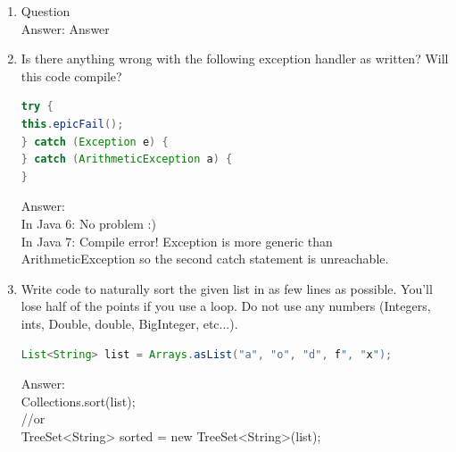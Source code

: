 \documentclass[11pt]{article}
\newenvironment{answer}{\large\lstset{basicstyle=\large\ttfamily}\color{white} \small{Answer:}}{}
\newenvironment{answer}{\large\lstset{basicstyle=\large\ttfamily}\color{red} \small{Answer:}}{}
\begin{document}
\begin{enumerate}
\item Question \\
\begin{answer}
Answer
\end{answer}



\item Is there anything wrong with the following exception handler as written? Will this
code compile? 
\begin{lstlisting}[language=java]
try {
this.epicFail();
} catch (Exception e) {
} catch (ArithmeticException a) {
}
\end{lstlisting}
\begin{answer}
\\ In Java 6: No problem :)
\\ In Java 7: Compile error!  Exception is more generic than ArithmeticException so the second catch statement is unreachable.
\end{answer}



\item Write code to naturally sort the given list in as few lines as possible. You'll lose half
of the points if you use a loop. Do not use any numbers (Integers, ints, Double, double,
BigInteger, etc...).
\begin{lstlisting}[language=java]
List<String> list = Arrays.asList("a", "o", "d", f", "x");
\end{lstlisting}
\begin{answer}
\\Collections.sort(list);
\\//or
\\TreeSet<String> sorted = new TreeSet<String>(list);
\end{answer}



\end{enumerate}
\end{document}
